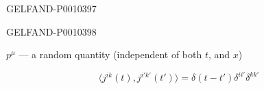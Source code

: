 \begin{GelfandAdjacentEvidence}{GELFAND-P001039}{7}


\end{GelfandAdjacentEvidence}
\begin{GelfandAdjacentEvidence}{GELFAND-P001039}{8}

$p^\mu$ --- a random quantity (independent of both $t$, and $x$)
\end{GelfandAdjacentEvidence}


\begin{equation*}
\langle j^{ik}(t),j^{i'k'}(t')\rangle=\delta(t-t')\delta^{ii'}\delta^{kk'}
\tag{13}
\end{equation*}



